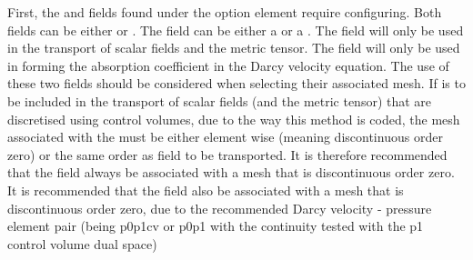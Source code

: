 First, the  and  fields found under the option element  require configuring. Both fields can be either  or . The  field can be either a  or a . The  field will only be used in the transport of scalar fields and the metric tensor. The  field will only be used in forming the absorption coefficient in the Darcy velocity equation. The use of these two fields should be considered when selecting their associated mesh. If  is to be included in the transport of scalar fields (and the metric tensor) that are discretised using control volumes, due to the way this method is coded, the mesh associated with the  must be either element wise (meaning discontinuous order zero) or the same order as field to be transported. It is therefore recommended that the  field always be 
associated with a mesh that is discontinuous order zero. It is recommended that the  field also be associated with a mesh that is discontinuous order zero, due to the recommended Darcy velocity - pressure element pair (being p0p1cv or p0p1 with the continuity tested with the p1 control volume dual space)

